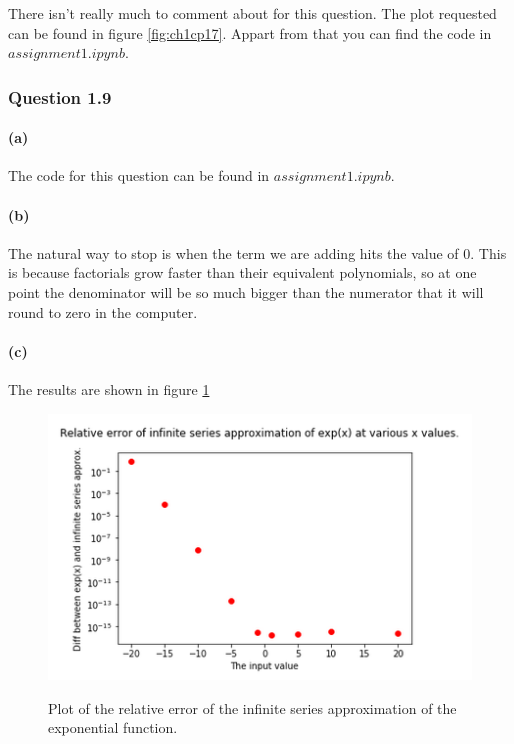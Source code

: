 \documentclass{article}
\begin{document}
There isn't really much to comment about for this question. The plot 
requested can be found in figure \ref{fig:ch1cp17}. Appart from that 
you can find the code in $assignment1.ipynb.$\\




\subsubsection{Question 1.9}

\paragraph{(a)} The code for this question can be found in 
$assignment1.ipynb.$

\paragraph{(b)} The natural way to stop is when the term we are adding 
hits the value of 0. This is because factorials grow faster than their 
equivalent polynomials, so at one point the denominator will be so much 
bigger than the numerator that it will round to zero in the computer.

\paragraph{(c)} The results are shown in figure \ref{fig:q19}


\begin{figure}[H]
	\includegraphics[width=\textwidth]{exp_infinite_series.png}
	\label{fig:q19}
	\caption{Plot of the relative error of the infinite series 
	approximation
	of the exponential function.}
\end{figure}
\end{document}
